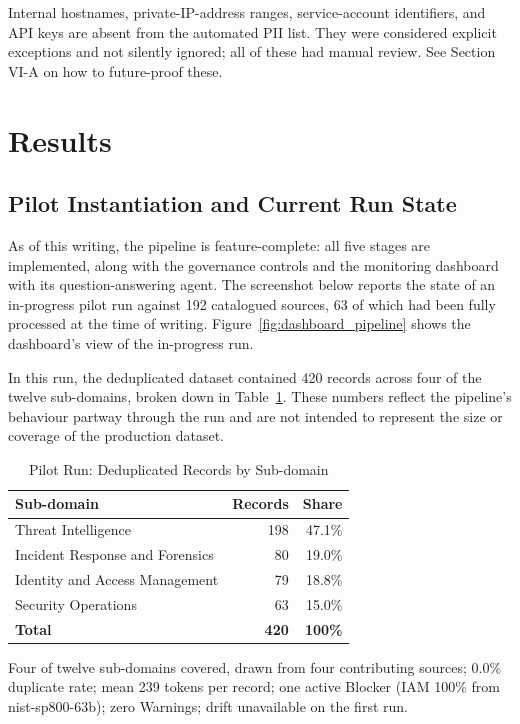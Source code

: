 \documentclass[conference]{IEEEtran}
\begin{document}
Internal hostnames, private-IP-address ranges, service-account identifiers, and API keys are absent from the automated PII list. They were considered explicit exceptions and not silently ignored; all of these had manual review. See Section VI-A on how to future-proof these.

\section{Results}

\subsection{Pilot Instantiation and Current Run State}

As of this writing, the pipeline is feature-complete: all five stages are implemented, along with the governance controls and the monitoring dashboard with its question-answering agent. The screenshot below reports the state of an in-progress pilot run against 192 catalogued sources, 63 of which had been fully processed at the time of writing. Figure~\ref{fig:dashboard_pipeline} shows the dashboard's view of the in-progress run.

In this run, the deduplicated dataset contained 420 records across four of the twelve sub-domains, broken down in Table~\ref{tab:pilot}. These numbers reflect the pipeline's behaviour partway through the run and are not intended to represent the size or coverage of the production dataset.

\begin{table}[t]
\caption{Pilot Run: Deduplicated Records by Sub-domain}
\label{tab:pilot}
\centering
\renewcommand{\arraystretch}{1.2}
\begin{tabular}{|l|r|r|}
\hline
Sub-domain & Records & Share \\ \hline
Threat Intelligence             & 198 & 47.1\% \\ \hline
Incident Response and Forensics & 80  & 19.0\% \\ \hline
Identity and Access Management  & 79  & 18.8\% \\ \hline
Security Operations             & 63  & 15.0\% \\ \hline
\textbf{Total}                  & \textbf{420} & \textbf{100\%} \\ \hline
\end{tabular}

\smallskip
{\footnotesize Four of twelve sub-domains covered, drawn from four contributing
sources; 0.0\% duplicate rate; mean 239 tokens per record; one active Blocker
(IAM 100\% from nist-sp800-63b); zero Warnings; drift unavailable on the
first run.}
\end{table}
\end{document}
